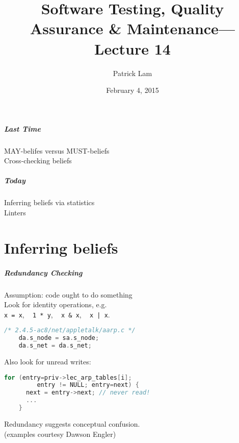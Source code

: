 \documentclass{beamer}
\title{Software Testing, Quality Assurance \& Maintenance---Lecture 14}
\author{Patrick Lam}
\date{February 4, 2015}
\newenvironment{changemargin}[1]{%
  \begin{list}{}{%
    \setlength{\topsep}{0pt}%
    \setlength{\leftmargin}{#1}%
    \setlength{\rightmargin}{1em}
    \setlength{\listparindent}{\parindent}%
    \setlength{\itemindent}{\parindent}%
    \setlength{\parsep}{\parskip}%
  }%
  \item[]}{\end{list}}
\begin{document}
\begin{frame}
  \titlepage
\end{frame}

\begin{frame}
  \frametitle{Last Time}

  \begin{changemargin}{2cm}
    MAY-belifes versus MUST-beliefs\\[1em]
    Cross-checking beliefs
  \end{changemargin}
\end{frame}

\begin{frame}
\frametitle{Today}
\begin{changemargin}{2cm}
Inferring beliefs via statistics\\
Linters\\
\end{changemargin}
\end{frame}

\part{Inferring beliefs}
\frame{\partpage}

\begin{frame}[fragile]
\frametitle{Redundancy Checking}
  \begin{changemargin}{2cm}
    Assumption: code ought to do something\\[1em]
    Look for identity operations, e.g.\\
\hspace*{4em} {\tt x = x}, ~ {\tt 1 * y}, ~ {\tt x \& x}, ~ {\tt x | x}.\\
  \end{changemargin}
{\small
\begin{lstlisting}[language=C]
    /* 2.4.5-ac8/net/appletalk/aarp.c */
    da.s_node = sa.s_node;
    da.s_net = da.s_net;
\end{lstlisting}
}
  \begin{changemargin}{2cm}
    Also look for unread writes:\\
  \end{changemargin}

{\small \begin{lstlisting}[language=C]
    for (entry=priv->lec_arp_tables[i]; 
         entry != NULL; entry=next) {
      next = entry->next; // never read!
      ...
    }
\end{lstlisting} 
}
  \begin{changemargin}{2cm}
Redundancy suggests conceptual confusion.\\
\small \hfill (examples courtesy Dawson Engler)
 
  \end{changemargin}

\end{frame}
\end{document}
